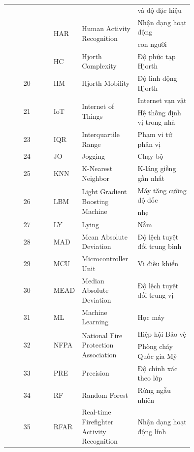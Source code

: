 \begin{longtable}{
        c
        p{0.15\linewidth}
        p{0.30\linewidth}
        p{0.30\linewidth}
    }
    \multirow{2}{*}{} & & & và độ đặc hiệu\\
    \multirow{2}{*}{18} & \multirow{2}{*}{HAR}  & \multirow{2}{*}{Human Activity Recognition}     & Nhận dạng hoạt động\\
    \multirow{2}{*}{} & & & con người\\
    19 & HC    & Hjorth Complexity               & Độ phức tạp Hjorth\\
    20 & HM    & Hjorth Mobility                 & Độ linh động Hjorth\\
    \multirow{2}{*}{21} & \multirow{2}{*}{IoT}  & \multirow{2}{*}{Internet of Things}             & Internet vạn vật\\
    22 & IPS   & Indoor Positioning System       & Hệ thống định vị trong nhà\\
    23 & IQR   & Interquartile Range             & Phạm vi tứ phân vị\\
    24 & JO    & Jogging                         & Chạy bộ\\
    25 & KNN   & K-Nearest Neighbor              & K-láng giềng gần nhất\\
    \multirow{2}{*}{26} & \multirow{2}{*}{LBM}  & \multirow{2}{*}{Light Gradient Boosting Machine} & Máy tăng cường độ dốc\\
    \multirow{2}{*}{} & & & nhẹ\\
    27 & LY    & Lying                           & Nằm\\
    28 & MAD   & Mean Absolute Deviation         & Độ lệch tuyệt đối trung bình\\
    29 & MCU   & Microcontroller Unit            & Vi điều khiển\\
    30 & MEAD  & Median Absolute Deviation       & Độ lệch tuyệt đối trung vị\\
    31 & ML    & Machine Learning                & Học máy\\
    \multirow{2}{*}{32} & \multirow{2}{*}{NFPA} & \multirow{2}{*}{National Fire Protection Association} & Hiệp hội Bảo vệ\\
    \multirow{2}{*}{} & & & Phòng cháy Quốc gia Mỹ\\
    33 & PRE   & Precision                       & Độ chính xác theo lớp\\
    34 & RF    & Random Forest                   & Rừng ngẫu nhiên\\
    \multirow{2}{*}{35} & \multirow{2}{*}{RFAR} & \multirow{2}{*}{Real-time Firefighter Activity Recognition} & Nhận dạng hoạt động lính\\

\end{longtable}
